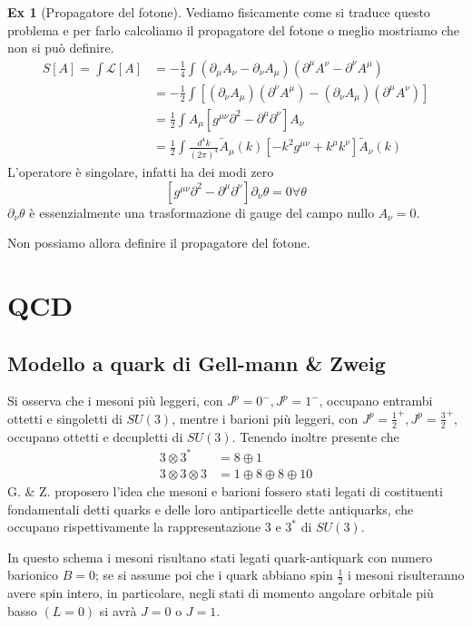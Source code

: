 \documentclass[10pt,a4paper]{article}
\theoremstyle{definition}
\newtheorem{example}{Ex}[section]
\newcommand{\lagr}{\mathcal{L}} %
\begin{document}
\begin{example}[Propagatore del fotone]
    Vediamo fisicamente come si traduce questo problema e per farlo calcoliamo il propagatore del fotone o meglio mostriamo che non si può definire.
    \begin{align*}
    S[A] = \int \lagr[A] &= -\frac14 \int (\partial_\mu A_\nu - \partial_\nu A_\mu)(\partial^\mu A^\nu - \partial^\nu A^\mu)      \\
    &= -\frac12 \int [(\partial_\nu A_\mu)(\partial^\nu A^\mu) - (\partial_\nu A_\mu)(\partial^\mu A^\nu)]   \\
    &= \frac12 \int A_\mu [g^{\mu \nu} \partial^2 - \partial^\mu \partial^\nu]A_\nu \\
    &= \frac12 \int \frac{d^4 k}{(2\pi)^4} \tilde{A}_\mu(k)[-k^2 g^{\mu\nu} + k^\mu k^\nu]\tilde{A}_\nu(k)
    \end{align*}
    L'operatore è singolare, infatti ha dei modi zero
    \[
        [g^{\mu \nu} \partial^2 - \partial^\mu \partial^\nu] \partial_\nu \theta = 0 \forall \theta
    \]
    $\partial_\nu\theta$ è essenzialmente una trasformazione di gauge del campo nullo $A_\nu = 0$.

    Non possiamo allora definire il propagatore del fotone.
    
\end{example}

\section{QCD}
\subsection{Modello a quark di Gell-mann \& Zweig}
Si osserva che i mesoni più leggeri, con \(J^p = 0^-, J^p = 1^-\), occupano entrambi ottetti e singoletti di \(SU(3)\), mentre i barioni più leggeri, con \(J^p = \frac12^+, J^p=\frac32^+\), occupano ottetti e decupletti di \(SU(3)\).
Tenendo inoltre presente che 
\begin{align*}
    3 \otimes 3^* &= 8 \oplus 1 \\
    3 \otimes 3 \otimes 3 &= 1 \oplus 8 \oplus 8 \oplus 10
\end{align*}
G. \& Z. proposero l'idea che mesoni e barioni fossero stati legati di costituenti fondamentali detti quarks e delle loro antiparticelle dette antiquarks, che occupano rispettivamente la rappresentazione \(3\) e \(3^*\) di \(SU(3)\).

In questo schema i mesoni risultano stati legati quark-antiquark con numero barionico \(B = 0\); se si assume poi che i quark abbiano spin \(\frac12\) i mesoni risulteranno avere spin intero, in particolare, negli stati di momento angolare orbitale più basso \((L = 0)\) si avrà \(J = 0\) o \(J = 1\).
\end{document}
